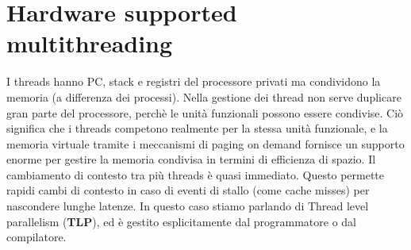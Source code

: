 \section{Hardware supported multithreading}
I threads hanno PC, stack e registri del processore privati ma condividono la memoria (a differenza dei processi). Nella gestione dei thread non serve duplicare gran parte del processore, perchè le unità funzionali possono essere condivise. Ciò significa che i threads competono realmente per la stessa unità funzionale, e la memoria virtuale tramite i meccanismi di paging on demand fornisce un supporto enorme per gestire la memoria condivisa in termini di efficienza di spazio. Il cambiamento di contesto tra più threads è quasi immediato. Questo permette rapidi cambi di contesto in caso di eventi di stallo (come cache misses) per nascondere lunghe latenze. In questo caso stiamo parlando di Thread level parallelism (\textbf{TLP}), ed è gestito esplicitamente dal programmatore o dal compilatore. 
